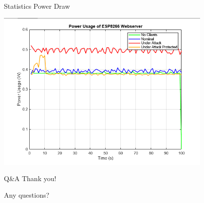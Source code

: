 \documentclass{beamer}
\begin{document}
\begin{frame}{Statistics}
Power Draw
    \vspace{1em}

  \begin{center}
    \includegraphics[width=0.8\textwidth]{images/power_usage_esp8266.png}
  \end{center}
\end{frame}

\begin{frame}{Q\&A}
  \centering Thank you!\par
  \vspace{1em}
  \large Any questions?
\end{frame}
\end{document}
